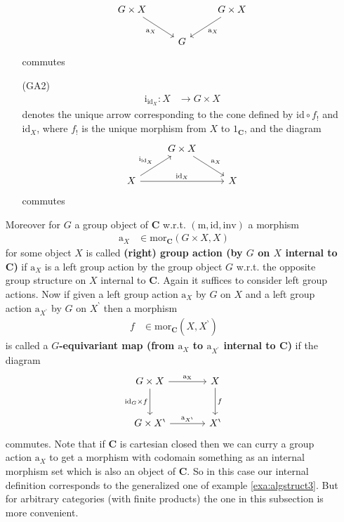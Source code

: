 \begin{exa}
\begin{enumerate}
\begin{enumerate}
\[\begin{tikzcd}[sep=normal]
  G
  \times
  X
  \arrow[swap]{dr}{\mathrm{a}_{X}}
  &
  &
  G
  \times
  X
  \arrow{dl}{\mathrm{a}_{X}}
  \\
  &
  G
  &
\end{tikzcd}
\]
commutes
\item[(GA2)]
\begin{align*}
  \mathrm{i}_{\mathrm{id}_{X}}
  \colon
  X
  &\rightarrow
  G
  \times
  X
\end{align*}
denotes the unique arrow corresponding to the cone defined by $\mathrm{id} \circ f_{!}$ and $\mathrm{id}_{X}$, where $f_{!}$ is the unique morphism from $X$ to $1_{\mathbf{C}}$, and the diagram
\[
\begin{tikzcd}[sep=normal]
  &
  G
  \times
  X
  \arrow{dr}{\mathrm{a}_{X}}
  &
  \\
  X
  \arrow{ur}{\mathrm{i}_{\mathrm{id}_{X}}}
  \arrow{rr}{\mathrm{id}_{X}}
  &
  &
  X
\end{tikzcd}
\]
commutes
\end{enumerate}
Moreover for $G$ a group object of $\mathbf{C}$ w.r.t. $(\mathrm{m},\mathrm{id},\mathrm{inv})$ a morphism
\begin{align*}
  \mathrm{a}_{X}
  &\in
  \mathrm{mor}_{\mathbf{C}}
  \left(
    G
    \times
    X,
    X
  \right)
\end{align*}
for some object $X$ is called \textbf{(right) group action (by $G$ on $X$ internal to $\mathbf{C}$)} if $\mathrm{a}_{X}$ is a left group action by the group object $G$ w.r.t. the opposite group structure on $X$ internal to $\mathbf{C}$. Again it suffices to consider left group actions. Now if given a left group action $\mathrm{a}_{X}$ by $G$ on $X$ and a left group action $\mathrm{a}_{X^{\backprime}}$ by $G$ on $X^{\backprime}$ then a morphism
\begin{align*}
  f
  &\in
  \mathrm{mor}_{\mathbf{C}}
  \left(
    X,
    X^{\backprime}
  \right)
\end{align*}
is called a \textbf{$G$-equivariant map (from $\mathrm{a}_{X}$ to $\mathrm{a}_{X^{\backprime}}$ internal to $\mathbf{C}$)} if the diagram
\[
\begin{tikzcd}[sep=large]
  G
  \times
  X
  \arrow{r}{\mathrm{a_{X}}}
  \arrow[swap]{d}{\mathrm{id}_{G} \times f}
  &
  X
  \arrow{d}{f}
  \\
  G
  \times
  X^{\backprime}
  \arrow{r}{\mathrm{a}_{X^{\backprime}}}
  &
  X^{\backprime}
\end{tikzcd}
\]
commutes. Note that if $\mathbf{C}$ is cartesian closed then we can curry a group action $\mathrm{a}_{X}$ to get a morphism with codomain something as an {\glqq}internal morphism set{\grqq} which is also an object of $\mathbf{C}$. So in this case our internal definition corresponds to the generalized one of example \ref{exa:algstruct3}. But for arbitrary categories (with finite products) the one in this subsection is more convenient.

\end{enumerate}
\end{exa}
